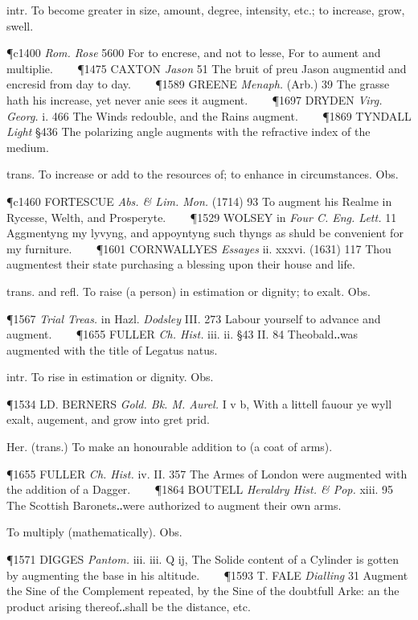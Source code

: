 \begin{description}[wide, labelwidth=!, labelindent=0pt]
\begin{myenumerate}
 intr. To become greater in size, amount, degree, intensity, etc.; to increase, grow, swell.

\P c1400 \textit{Rom. Rose} 5600 For to encrese, and not to lesse, For to aument and multiplie.    
\P 1475 CAXTON  \textit{Jason} 51 The bruit of preu Jason augmentid and encresid from day to day.    
\P 1589 GREENE  \textit{Menaph.} (Arb.) 39 The grasse hath his increase, yet never anie sees it augment.    
\P 1697 DRYDEN  \textit{Virg. Georg.} i. 466 The Winds redouble, and the Rains augment.    
\P 1869 TYNDALL  \textit{Light} §436 The polarizing angle augments with the refractive index of the medium.

 trans. To increase or add to the resources of; to enhance in circumstances. Obs.

\P c1460 FORTESCUE  \textit{Abs. \& Lim. Mon.} (1714) 93 To augment his Realme in Rycesse, Welth, and Prosperyte.    
\P 1529 WOLSEY in \textit{Four C. Eng. Lett.} 11 Aggmentyng my lyvyng, and appoyntyng such thyngs as shuld be convenient for my furniture.    
\P 1601 CORNWALLYES  \textit{Essayes} ii. xxxvi. (1631) 117 Thou augmentest their state purchasing a blessing upon their house and life.

 trans. and refl. To raise (a person) in estimation or dignity; to exalt. Obs.

\P 1567 \textit{Trial  Treas.} in Hazl. \textit{Dodsley} III. 273 Labour yourself to advance and augment.    
\P 1655 FULLER  \textit{Ch. Hist.} iii. ii. §43 II. 84 Theobald‥was augmented with the title of Legatus natus.

 intr. To rise in estimation or dignity. Obs.

\P 1534 LD. BERNERS  \textit{Gold. Bk. M. Aurel.} I v b, With a littell fauour ye wyll exalt, augement, and grow into gret prid.

 Her. (trans.) To make an honourable addition to (a coat of arms).

\P 1655 FULLER  \textit{Ch. Hist.} iv. II. 357 The Armes of London were augmented with the addition of a Dagger.    
\P 1864 BOUTELL  \textit{Heraldry Hist. \& Pop.} xiii. 95 The Scottish Baronets‥were authorized to augment their own arms.

 To multiply (mathematically). Obs.

\P 1571 DIGGES  \textit{Pantom.} iii. iii. Q ij, The Solide content of a Cylinder is gotten by augmenting the base in his altitude.    
\P 1593 T. FALE  \textit{Dialling} 31 Augment the Sine of the Complement repeated, by the Sine of the doubtfull Arke: an the product arising thereof‥shall be the distance, etc.
\end{myenumerate}




\end{description}
